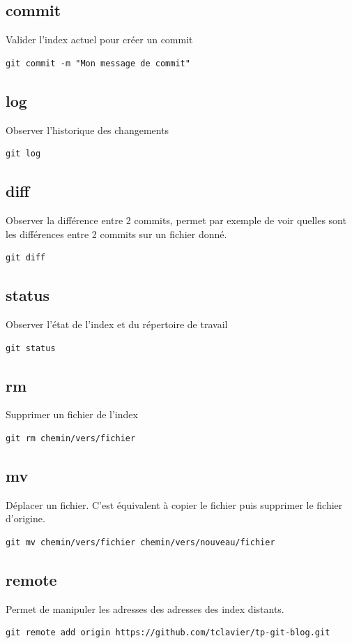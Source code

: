 \documentclass[a4paper]{article}
\begin{document}
\subsection*{commit}
Valider l'index actuel pour créer un commit
\begin{verbatim}
git commit -m "Mon message de commit"
\end{verbatim}

\subsection*{log}
Observer l'historique des changements
\begin{verbatim}
git log
\end{verbatim}

\subsection*{diff}
Observer la différence entre 2 commits, permet par exemple de voir quelles sont les différences entre 2 commits sur un fichier donné.

\begin{verbatim}
git diff
\end{verbatim}

\subsection*{status}
Observer l'état de l'index et du répertoire de travail
\begin{verbatim}
git status
\end{verbatim}

\subsection*{rm}
Supprimer un fichier de l'index
\begin{verbatim}
git rm chemin/vers/fichier
\end{verbatim}

\subsection*{mv}
Déplacer un fichier. C'est équivalent à copier le fichier puis supprimer le fichier d'origine.
\begin{verbatim}
git mv chemin/vers/fichier chemin/vers/nouveau/fichier
\end{verbatim}

\subsection*{remote}
Permet de manipuler les adresses des adresses des index distants.
\begin{verbatim}
git remote add origin https://github.com/tclavier/tp-git-blog.git
\end{verbatim}
\end{document}
